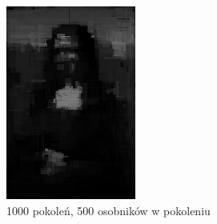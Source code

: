 \begin{figure}[!htb]
\begin{subfigure}[b]{0.3\textwidth}
         \includegraphics[width=\textwidth]{images/mona/dependence/1000_500.png}
         \caption{1000 pokoleń, 500 osobników w pokoleniu}
    \end{subfigure}
    \begin{subfigure}[b]{0.3\textwidth}
        \centering
        \label{fig:dependence_500_1000}

\end{subfigure}
\end{figure}
